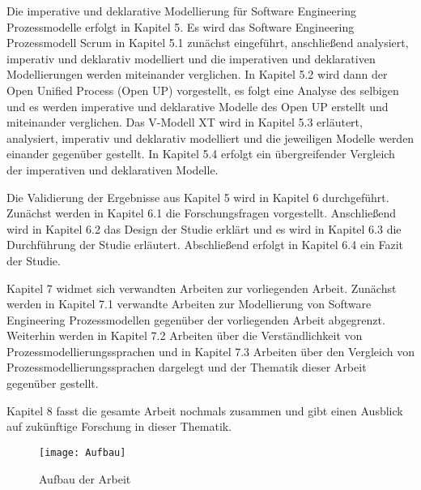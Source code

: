 Die imperative und deklarative Modellierung für Software Engineering Prozessmodelle erfolgt in Kapitel 5. Es wird das Software Engineering Prozessmodell Scrum in Kapitel 5.1 zunächst eingeführt, anschließend analysiert, imperativ und deklarativ modelliert und die imperativen und deklarativen Modellierungen werden miteinander verglichen. In Kapitel 5.2 wird dann der Open Unified Process (Open UP) vorgestellt, es folgt eine Analyse des selbigen und es werden imperative und deklarative Modelle des Open UP erstellt und miteinander verglichen. Das V-Modell XT wird in Kapitel 5.3 erläutert, analysiert, imperativ und deklarativ modelliert und die jeweiligen Modelle werden einander gegenüber gestellt. In Kapitel 5.4 erfolgt ein übergreifender Vergleich der imperativen und deklarativen Modelle.\newline

Die Validierung der Ergebnisse aus Kapitel 5 wird in Kapitel 6 durchgeführt. Zunächst werden in Kapitel 6.1 die Forschungsfragen vorgestellt. Anschließend wird in Kapitel 6.2 das Design der Studie erklärt und es wird in Kapitel 6.3 die Durchführung der Studie erläutert. Abschließend erfolgt in Kapitel 6.4 ein Fazit der Studie.  \newline

Kapitel 7 widmet sich verwandten Arbeiten zur vorliegenden Arbeit. Zunächst werden in Kapitel 7.1 verwandte Arbeiten zur Modellierung von Software Engineering Prozessmodellen gegenüber der vorliegenden Arbeit abgegrenzt. Weiterhin werden in Kapitel 7.2 Arbeiten über die Verständlichkeit von Prozessmodellierungssprachen und in Kapitel 7.3 Arbeiten über den Vergleich von Prozessmodellierungssprachen dargelegt und der Thematik dieser Arbeit gegenüber gestellt.\newline

Kapitel 8 fasst die gesamte Arbeit nochmals zusammen und gibt einen Ausblick auf zukünftige Forschung in dieser Thematik.

\begin{figure}[htp]
\begin{center}
  \texttt{[image: Aufbau]} %
  \caption{Aufbau der Arbeit}
  \label{fig:Aufbau}
\end{center}
\end{figure}

